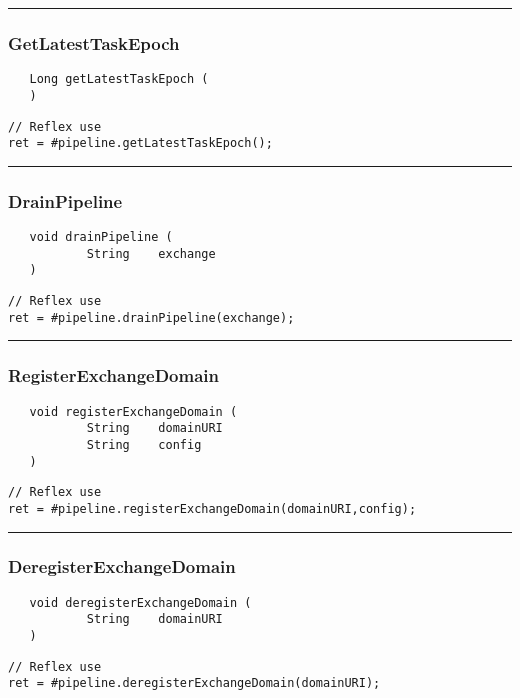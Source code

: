 \rule{15cm}{2pt}
\subsubsection{GetLatestTaskEpoch}
\label{Api:GetLatestTaskEpoch}
\begin{verbatim}
   Long getLatestTaskEpoch (
   )
\end{verbatim}
\begin{lstlisting}[language=reflex]
// Reflex use
ret = #pipeline.getLatestTaskEpoch();
\end{lstlisting}



\rule{15cm}{2pt}
\subsubsection{DrainPipeline}
\label{Api:DrainPipeline}
\begin{verbatim}
   void drainPipeline (
           String    exchange
   )
\end{verbatim}
\begin{lstlisting}[language=reflex]
// Reflex use
ret = #pipeline.drainPipeline(exchange);
\end{lstlisting}



\rule{15cm}{2pt}
\subsubsection{RegisterExchangeDomain}
\label{Api:RegisterExchangeDomain}
\begin{verbatim}
   void registerExchangeDomain (
           String    domainURI
           String    config
   )
\end{verbatim}
\begin{lstlisting}[language=reflex]
// Reflex use
ret = #pipeline.registerExchangeDomain(domainURI,config);
\end{lstlisting}



\rule{15cm}{2pt}
\subsubsection{DeregisterExchangeDomain}
\label{Api:DeregisterExchangeDomain}
\begin{verbatim}
   void deregisterExchangeDomain (
           String    domainURI
   )
\end{verbatim}
\begin{lstlisting}[language=reflex]
// Reflex use
ret = #pipeline.deregisterExchangeDomain(domainURI);
\end{lstlisting}



